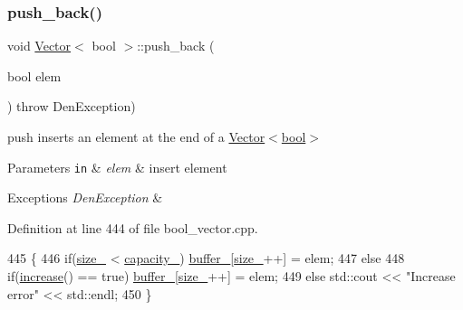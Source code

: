 \subsubsection{\texorpdfstring{push\+\_\+back()}{push\_back()}}
{\footnotesize\ttfamily void \hyperlink{classVector}{Vector}$<$ bool $>$\+::push\+\_\+back (\begin{DoxyParamCaption}\item[{bool}]{elem }\end{DoxyParamCaption}) throw  Den\+Exception) }



push  inserts an element at the end of a \hyperlink{classVector_3_01bool_01_4}{Vector$<$bool$>$} 


\begin{DoxyParams}[1]{Parameters}
\mbox{\tt in}  & {\em elem} & insert element \\
\hline
\end{DoxyParams}

\begin{DoxyExceptions}{Exceptions}
{\em Den\+Exception} & \\
\hline
\end{DoxyExceptions}


Definition at line 444 of file bool\+\_\+vector.\+cpp.


\begin{DoxyCode}
445     \{
446         \textcolor{keywordflow}{if}(\hyperlink{classVector_3_01bool_01_4_a07895adb41b2c819f85640e35c0d4ae0}{size\_} < \hyperlink{classVector_3_01bool_01_4_ac3da0e4580bca55cab445ed3f9c50f2d}{capacity\_}) \hyperlink{classVector_3_01bool_01_4_ae2183c11de877eb13209c6a5a593604f}{buffer\_}[\hyperlink{classVector_3_01bool_01_4_a07895adb41b2c819f85640e35c0d4ae0}{size\_}++] = elem;
447         \textcolor{keywordflow}{else}
448             \textcolor{keywordflow}{if}(\hyperlink{classVector_3_01bool_01_4_afebfb559bb1f4b771fe43b5d2a94a3d7}{increase}() == \textcolor{keyword}{true})  \hyperlink{classVector_3_01bool_01_4_ae2183c11de877eb13209c6a5a593604f}{buffer\_}[\hyperlink{classVector_3_01bool_01_4_a07895adb41b2c819f85640e35c0d4ae0}{size\_}++] = elem;
449             \textcolor{keywordflow}{else}                    std::cout << \textcolor{stringliteral}{"Increase error"} << std::endl;
450     \}
\end{DoxyCode}
\mbox{\label{classVector_3_01bool_01_4_acb9a245334b171ea1ad0d9bda20da76e}} 
